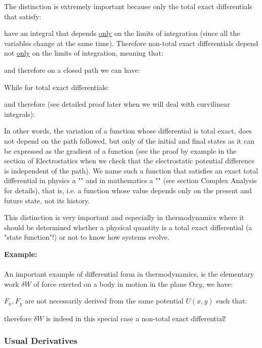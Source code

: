 	The distinction is extremely important because only the total exact differentials that satisfy:
	
	have an integral that depends \underline{only} on the limits of integration (since all the variables change at the same time). Therefore non-total exact differentials depend not \underline{only} on the limits of integration, meaning that:
	
	and therefore on a closed path we can have:
	
	While for total exact differentials:
	
	and therefore (see detailed proof later when we will deal with curvilinear integrals):
	
	In other words, the variation of a function whose differential is total exact, does not depend on the path followed, but only of the initial and final states as it can be expressed as the gradient of a function (see the proof by example in the section of Electrostatics when we check that the electrostatic potential difference is independent of the path). We name such a function that satisfies an exact total differential in physics a "" and in mathematics a "" (see section Complex Analysis for details), that is, i.e. a function whose value depends only on the present and future state, not its history.
	
	This distinction is very important and especially in thermodynamics where it should be determined whether a physical quantity is a total exact differential (a "state function"!) or not to know how systems evolve.
	
	\begin{tcolorbox}[colframe=black,colback=white,sharp corners]
\textbf{{\Large {}}Example:}\\\\
An important example of differential form in thermodynamics, is the elementary work $\delta W$ of  force exerted on a body in motion in the plane $\text{O}xy$, we have:
	
	$F_x,F_y$ are not necessarily derived from the same potential $U(x, y)$ such that:
	
	therefore  $\delta W$ is indeed in this special case a non-total exact differential!
	\end{tcolorbox}
	 
	 \subsubsection{Usual Derivatives}
	 
